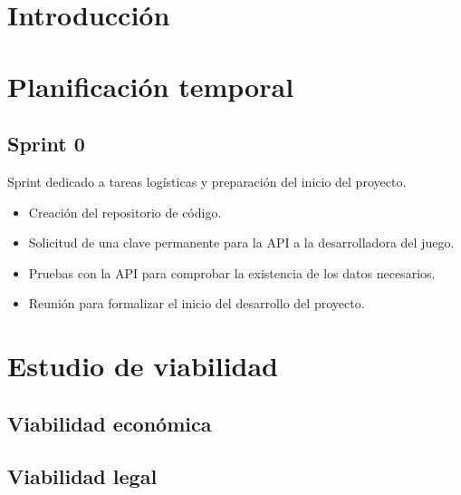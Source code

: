 
\section{Introducción}

\section{Planificación temporal}

\subsection{Sprint 0}

Sprint dedicado a tareas logísticas y preparación del inicio del proyecto.

\begin{itemize}
    \item Creación del repositorio de código.
    \item Solicitud de una clave permanente para la API a la desarrolladora del juego.
    \item Pruebas con la API para comprobar la existencia de los datos necesarios.
    \item Reunión para formalizar el inicio del desarrollo del proyecto.
\end{itemize}

\section{Estudio de viabilidad}

\subsection{Viabilidad económica}

\subsection{Viabilidad legal}


